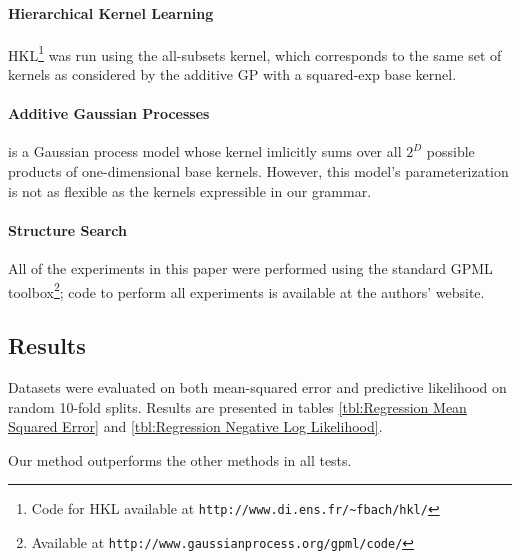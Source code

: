 \documentclass[twoside]{article}
\begin{document}
\paragraph{Hierarchical Kernel Learning}	
HKL\footnote{Code for HKL available at \texttt{http://www.di.ens.fr/\textasciitilde fbach/hkl/}} was run using the all-subsets kernel, which corresponds to the same set of kernels as considered by the additive GP with a squared-exp base kernel.

\paragraph{Additive Gaussian Processes} \cite{duvenaud2011additive11} is a Gaussian process model whose kernel imlicitly sums over all $2^D$ possible products of one-dimensional base kernels.  
However, this model's parameterization is not as flexible as the kernels expressible in our grammar.

\paragraph{Structure Search}
All of the experiments in this paper were performed using the standard GPML toolbox\footnote{Available at \texttt{http://www.gaussianprocess.org/gpml/code/}}; code to perform all experiments is available at the authors' website.


\subsection{Results}

Datasets were evaluated on both mean-squared error and predictive likelihood on random 10-fold splits.
Results are presented in tables \ref{tbl:Regression Mean Squared Error} and \ref{tbl:Regression Negative Log Likelihood}.
%


%
Our method outperforms the other methods in all tests.
\end{document}

